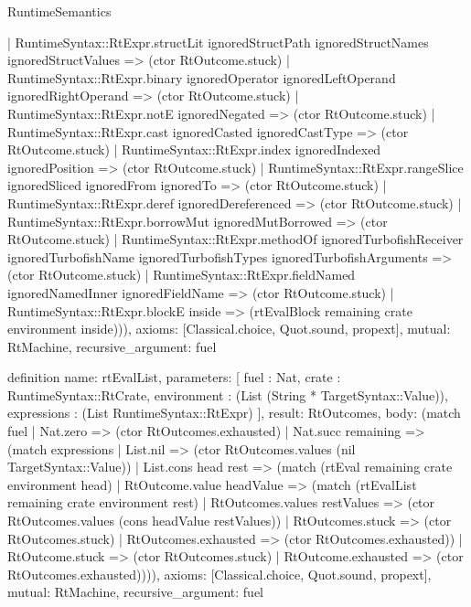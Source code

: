 \begin{lexlean}{RuntimeSemantics}
\begin{semanticmodule}
{      | RuntimeSyntax::RtExpr.structLit ignoredStructPath ignoredStructNames ignoredStructValues => (ctor RtOutcome.stuck)
      | RuntimeSyntax::RtExpr.binary ignoredOperator ignoredLeftOperand ignoredRightOperand => (ctor RtOutcome.stuck)
      | RuntimeSyntax::RtExpr.notE ignoredNegated => (ctor RtOutcome.stuck)
      | RuntimeSyntax::RtExpr.cast ignoredCasted ignoredCastType => (ctor RtOutcome.stuck)
      | RuntimeSyntax::RtExpr.index ignoredIndexed ignoredPosition => (ctor RtOutcome.stuck)
      | RuntimeSyntax::RtExpr.rangeSlice ignoredSliced ignoredFrom ignoredTo => (ctor RtOutcome.stuck)
      | RuntimeSyntax::RtExpr.deref ignoredDereferenced => (ctor RtOutcome.stuck)
      | RuntimeSyntax::RtExpr.borrowMut ignoredMutBorrowed => (ctor RtOutcome.stuck)
      | RuntimeSyntax::RtExpr.methodOf ignoredTurbofishReceiver ignoredTurbofishName ignoredTurbofishTypes ignoredTurbofishArguments => (ctor RtOutcome.stuck)
      | RuntimeSyntax::RtExpr.fieldNamed ignoredNamedInner ignoredFieldName => (ctor RtOutcome.stuck)
      | RuntimeSyntax::RtExpr.blockE inside => (rtEvalBlock remaining crate environment inside))),
  axioms: [Classical.choice, Quot.sound, propext],
  mutual: RtMachine,
  recursive_argument: fuel
}

definition{
  name: rtEvalList,
  parameters: [
    fuel : Nat,
    crate : RuntimeSyntax::RtCrate,
    environment : (List (String * TargetSyntax::Value)),
    expressions : (List RuntimeSyntax::RtExpr)
  ],
  result: RtOutcomes,
  body: (match fuel
    | Nat.zero => (ctor RtOutcomes.exhausted)
    | Nat.succ remaining => (match expressions
      | List.nil => (ctor RtOutcomes.values (nil TargetSyntax::Value))
      | List.cons head rest => (match (rtEval remaining crate environment head)
        | RtOutcome.value headValue => (match (rtEvalList remaining crate environment rest)
          | RtOutcomes.values restValues => (ctor RtOutcomes.values (cons headValue restValues))
          | RtOutcomes.stuck => (ctor RtOutcomes.stuck)
          | RtOutcomes.exhausted => (ctor RtOutcomes.exhausted))
        | RtOutcome.stuck => (ctor RtOutcomes.stuck)
        | RtOutcome.exhausted => (ctor RtOutcomes.exhausted)))),
  axioms: [Classical.choice, Quot.sound, propext],
  mutual: RtMachine,
  recursive_argument: fuel
}


\end{semanticmodule}
\end{lexlean}

